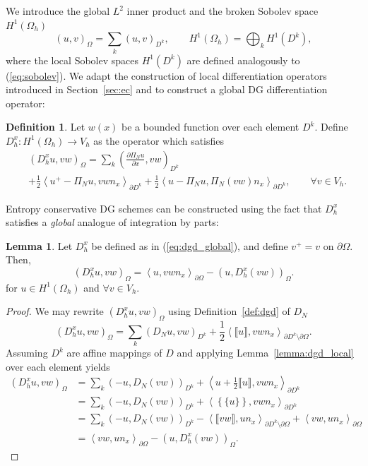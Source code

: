 \documentclass[preprint,10pt]{elsarticle}
\theoremstyle{definition}
\newtheorem{definition}{Definition}
\theoremstyle{lemma}
\newtheorem{lemma}{Lemma}
\theoremstyle{theorem}
\theoremstyle{assumption}
\newcommand{\pd}[2]{\frac{\partial#1}{\partial#2}}
\newcommand{\LRp}[1]{\left( #1 \right)}
\newcommand{\LRa}[1]{\left\langle #1 \right\rangle}
\newcommand{\LRc}[1]{\left\{ #1 \right\}}
\newcommand{\jump}[1] {\ensuremath{\llbracket#1\rrbracket}}
\newcommand{\avg}[1] {\ensuremath{\LRc{\!\{#1\}\!}}}
\newcommand{\Oh}{{\Omega_h}}
\begin{document}
We introduce the global $L^2$ inner product and the broken Sobolev space $H^1\LRp{\Oh}$ 
\[
\LRp{u,v}_{\Omega} = \sum_k \LRp{u,v}_{D^k}, \qquad H^1\LRp{\Oh} = \bigoplus_{k} H^1\LRp{D^k},
\]
where the local Sobolev spaces $H^1\LRp{D^k}$ are defined analogously to (\ref{eq:sobolev}).  
We adapt the construction of local differentiation operators introduced in Section~\ref{sec:ec} and \cite{chen2017entropy} to construct a global DG differentiation operator:
\begin{definition}
Let $w(x)$ be a bounded function over each element $D^k$.  Define $D^x_h: H^1\LRp{\Oh}\rightarrow V_h$ as the operator which satisfies
\begin{align}
&\LRp{D^x_h u,vw}_{\Omega} = \sum_k \LRp{\pd{ \Pi_N u}{x},vw}_{D^k} \nonumber\\
&+ \frac{1}{2}{\LRa{{u^+ - \Pi_N u}, vw{n}_x}_{\partial D^k} + \frac{1}{2}\LRa{{u - \Pi_Nu },\Pi_N(vw) {n}_x}_{\partial D^k}}, \qquad \forall v \in V_h.
\label{eq:dgd_global}
\end{align}
\end{definition}
Entropy conservative DG schemes can be constructed using the fact that $D^x_h$ satisfies a \textit{global} analogue of integration by parts:
\begin{lemma}
\label{lemma:ibp}
Let $D^x_h$ be defined as in (\ref{eq:dgd_global}), and define $v^+ = v$ on $\partial \Omega$.  Then, 
\[
\LRp{D^x_h u,vw}_{\Omega} = \LRa{u,vw{n}_x}_{\partial \Omega} - \LRp{u,D^x_h (vw)}_{\Omega}.
\]
for $u \in H^1(\Oh)$ and $\forall v\in V_h$.  
\end{lemma}
\begin{proof}
We may rewrite $\LRp{D^x_h u,vw}_{\Omega}$ using Definition~\ref{def:dgd} of $D_N$
\[
\LRp{D^x_h u,vw}_{\Omega} = \sum_k \LRp{D_N u,vw}_{D^k} + \frac{1}{2}\LRa{\jump{u},vw{n}_x}_{\partial D^k \setminus \partial \Omega}.  
\]
Assuming $D^k$ are affine mappings of $\widehat{D}$ and applying Lemma~\ref{lemma:dgd_local} over each element yields 
\begin{align*}
\LRp{D^x_h u,vw}_{\Omega} &= \sum_k \LRp{-u,D_N (vw)}_{D^k} + \LRa{u + \frac{1}{2}\jump{u},vw{n}_x}_{\partial D^k}\\
&= \sum_k \LRp{-u,D_N (vw)}_{D^k} + \LRa{\avg{u},vw{n}_x}_{\partial D^k}\\
&= \sum_k \LRp{-u,D_N (vw)}_{D^k} - \LRa{\jump{vw},u{n}_x}_{\partial D^k \setminus \partial \Omega} + \LRa{vw,u{n}_x}_{\partial \Omega} \\
&= \LRa{vw,u{n}_x}_{\partial \Omega}-\LRp{u,D^x_h (vw)}_{\Omega}.    
\end{align*}
\end{proof}
\end{document}
